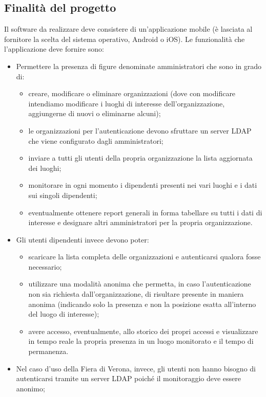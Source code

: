 \documentclass[../studio-di-fattibilita.tex]{subfiles}
\begin{document}
	\subsection{Finalità del progetto}
	\label{subsec:finalita_del_progetto}
	Il software da realizzare deve consistere di un'applicazione mobile (è lasciata al fornitore la scelta del sistema operativo, Android o iOS). Le funzionalità che l'applicazione deve fornire sono:
	\begin{itemize}
		\item Permettere la presenza di figure denominate amministratori che sono in grado di:
		\begin{itemize}
		    \item creare, modificare o eliminare organizzazioni (dove con modificare intendiamo modificare i luoghi di interesse dell’organizzazione, aggiungerne di nuovi o eliminarne alcuni);
		    \item le organizzazioni per l’autenticazione devono sfruttare un server LDAP che viene configurato dagli amministratori;
		    \item inviare a tutti gli utenti della propria organizzazione la lista aggiornata dei luoghi;
		    \item monitorare in ogni momento i dipendenti presenti nei vari luoghi e i dati sui singoli dipendenti;
		    \item eventualmente ottenere report generali in forma tabellare su tutti i dati di interesse e designare altri amministratori per la propria organizzazione.
		\end{itemize}
		\item Gli utenti dipendenti invece devono poter:
		\begin{itemize}
		    \item scaricare la lista completa delle organizzazioni e autenticarsi qualora fosse necessario;
		    \item utilizzare una modalità anonima che permetta, in caso l’autenticazione non sia richiesta dall’organizzazione, di risultare presente in maniera anonima (indicando solo la presenza e non la posizione esatta all’interno del luogo di interesse);
		    \item avere accesso, eventualmente, allo storico dei propri accessi e visualizzare in tempo reale la propria presenza in un luogo monitorato e il tempo di permanenza.
		\end{itemize}
		\item Nel caso d’uso della Fiera di Verona, invece, gli utenti non hanno bisogno di autenticarsi tramite un server LDAP poiché il monitoraggio deve essere anonimo;

\end{itemize}
\end{document}
